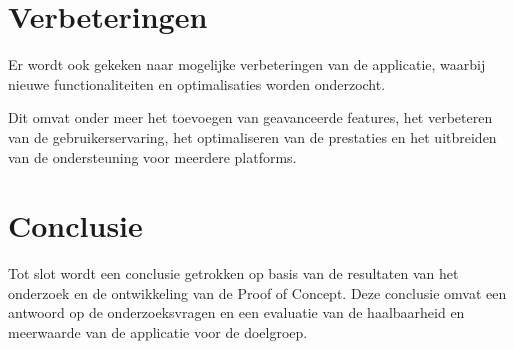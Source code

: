 \section{Verbeteringen}

Er wordt ook gekeken naar mogelijke verbeteringen van de applicatie, waarbij nieuwe functionaliteiten en optimalisaties worden onderzocht. 

Dit omvat onder meer het toevoegen van geavanceerde features, het verbeteren van de gebruikerservaring, het optimaliseren van de prestaties en het uitbreiden van de ondersteuning voor meerdere platforms. 

\section{Conclusie }

Tot slot wordt een conclusie getrokken op basis van de resultaten van het onderzoek en de ontwikkeling van de Proof of Concept. Deze conclusie omvat een antwoord op de onderzoeksvragen en een evaluatie van de haalbaarheid en meerwaarde van de applicatie voor de doelgroep.
